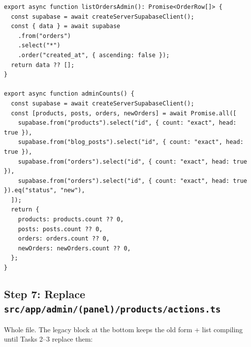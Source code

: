 \documentclass[11pt,a4paper]{article}
\begin{document}
\begin{lstlisting}
export async function listOrdersAdmin(): Promise<OrderRow[]> {
  const supabase = await createServerSupabaseClient();
  const { data } = await supabase
    .from("orders")
    .select("*")
    .order("created_at", { ascending: false });
  return data ?? [];
}

export async function adminCounts() {
  const supabase = await createServerSupabaseClient();
  const [products, posts, orders, newOrders] = await Promise.all([
    supabase.from("products").select("id", { count: "exact", head: true }),
    supabase.from("blog_posts").select("id", { count: "exact", head: true }),
    supabase.from("orders").select("id", { count: "exact", head: true }),
    supabase.from("orders").select("id", { count: "exact", head: true }).eq("status", "new"),
  ]);
  return {
    products: products.count ?? 0,
    posts: posts.count ?? 0,
    orders: orders.count ?? 0,
    newOrders: newOrders.count ?? 0,
  };
}
\end{lstlisting}

\subsection*{Step 7: Replace \texttt{src/app/admin/(panel)/products/actions.ts}}

Whole file. The legacy block at the bottom keeps the old form + list compiling until Tasks 2--3 replace
them:
\end{document}
